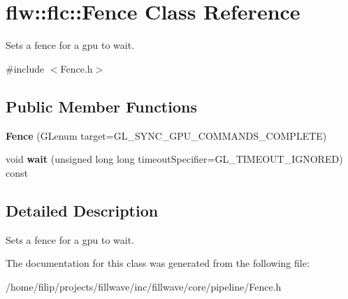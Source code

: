 \hypertarget{classflw_1_1flc_1_1Fence}{}\section{flw\+:\+:flc\+:\+:Fence Class Reference}
\label{classflw_1_1flc_1_1Fence}


Sets a fence for a gpu to wait.  




{\ttfamily \#include $<$Fence.\+h$>$}

\subsection*{Public Member Functions}
\begin{DoxyCompactItemize}
\item 
\mbox{\label{classflw_1_1flc_1_1Fence_a431a609115c5a2965b7e778897c7df7a}} 
{\bfseries Fence} (G\+Lenum target=G\+L\+\_\+\+S\+Y\+N\+C\+\_\+\+G\+P\+U\+\_\+\+C\+O\+M\+M\+A\+N\+D\+S\+\_\+\+C\+O\+M\+P\+L\+E\+TE)
\item 
\mbox{\label{classflw_1_1flc_1_1Fence_a0837c669bd405ced5c75fe2781136819}} 
void {\bfseries wait} (unsigned long long timeout\+Specifier=G\+L\+\_\+\+T\+I\+M\+E\+O\+U\+T\+\_\+\+I\+G\+N\+O\+R\+ED) const
\end{DoxyCompactItemize}


\subsection{Detailed Description}
Sets a fence for a gpu to wait. 

The documentation for this class was generated from the following file\+:\begin{DoxyCompactItemize}
\item 
/home/filip/projects/fillwave/inc/fillwave/core/pipeline/Fence.\+h\end{DoxyCompactItemize}
